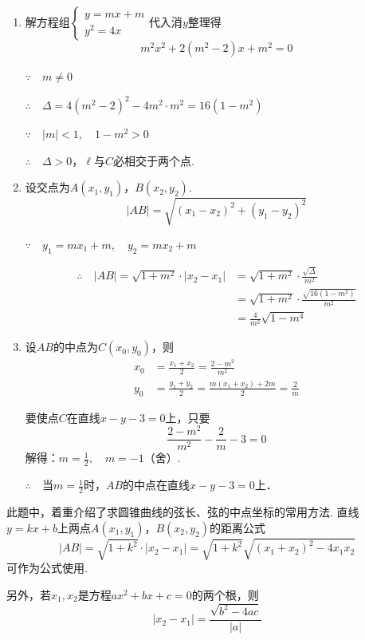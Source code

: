 \begin{solution}
\begin{enumerate}[(1)]
    \item 解方程组$\begin{cases}
        y=mx+m\\ y^2=4x
    \end{cases}$代入消$y$整理得
\begin{equation}
    m^2x^2+2(m^2-2)x+m^2=0 \tag{1}
\end{equation}

$\because\quad m\ne 0$

$\therefore\quad \Delta =4(m^2-2)^2-4m^2\cdot m^2=16(1-m^2)$    

$\because\quad |m|<1,\quad 1-m^2>0$
    
$\therefore\quad \Delta >0$，$\ell$与$C$必相交于两个点.

\item 设交点为$A(x_1,y_1)$，$B(x_2,y_2)$.
\[|AB|=\sqrt{(x_1-x_2)^2+(y_1-y_2)^2}\]

$\because\quad y_1=mx_1+m,\quad y_2=mx_2+m$

\[\begin{split}
    \therefore\quad |AB|=\sqrt{1+m^2}\cdot |x_2-x_1|
&=\sqrt{1+m^2}\cdot \frac{\sqrt{\Delta }}{m^2}\\
&=\sqrt{1+m^2}\cdot \frac{\sqrt{16(1-m^2)}}{m^2}\\
&=\frac{4}{m^2}\sqrt{1-m^4}
\end{split}\]

\item 设$AB$的中点为$C(x_0,y_0)$，则
\[\begin{split}
  x_0&=\frac{x_1+x_2}{2}=\frac{2-m^2}{m^2}\\
y_0&=\frac{y_1+y_2}{2}=\frac{m(x_1+x_2)+2m}{2}=\frac{2}{m}  
\end{split}\]

要使点$C$在直线$x-y-3=0$上，只要
\[\frac{2-m^2}{m^2}-\frac{2}{m}-3=0\]
解得：$m=\frac{1}{2},\quad m=-1$（舍）.

$\therefore\quad $当$m=\frac{1}{2}$时，$AB$的中点在直线$x-y-3=0$上．
\end{enumerate}
\end{solution}

\begin{remark}
此题中，着重介绍了求圆锥曲线的弦长、弦的中点坐标的常用方法. 直线$y=kx+b$上两点$A(x_1,y_1)$，$B(x_2,y_2)$的距离公式
\[|AB|=\sqrt{1+k^2}\cdot |x_2-x_1|=\sqrt{1+k^2}\sqrt{(x_1+x_2)^2-4x_1x_2}\]
可作为公式使用.

另外，若$x_1,x_2$是方程$ax^2+bx+c=0$的两个根，则
\[|x_2-x_1|=\frac{\sqrt{b^2-4ac}}{|a|}\]
\end{remark}

